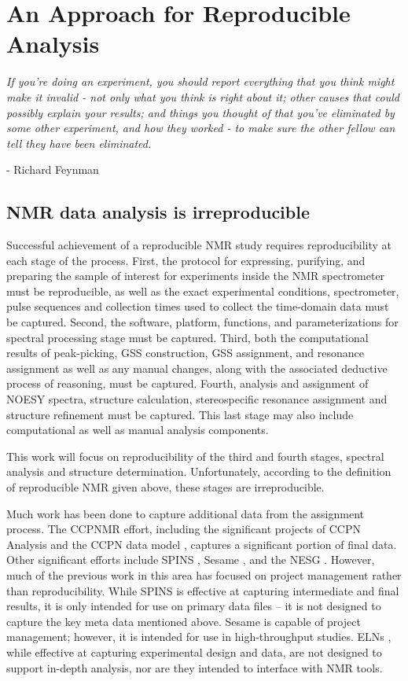 \chapter{An Approach for Reproducible Analysis}

\begin{center}
  \textit{If you're doing an experiment, you should report everything that 
    you think might make it invalid - not only what you think is right about it; 
    other causes that could possibly explain your results; and things you 
    thought of that you've eliminated by some other experiment, and how they 
    worked - to make sure the other fellow can tell they have been eliminated.}

 - Richard Feynman
\end{center}



\section{NMR data analysis is irreproducible}
Successful achievement of a reproducible NMR study requires reproducibility at 
each stage of the process.  First, the protocol for expressing, purifying, and 
preparing the sample of interest for experiments inside the NMR spectrometer 
must be reproducible, as well as the exact experimental conditions, 
spectrometer, pulse sequences and collection times used to collect the 
time-domain data must be captured.  Second, the software, platform, functions, 
and parameterizations for spectral processing stage must be captured.  
Third, both the computational results of peak-picking, GSS construction,
GSS assignment, and resonance assignment as well as any manual changes, 
along with the associated deductive process of reasoning, must be captured.  
Fourth, analysis and assignment of NOESY spectra, structure calculation, 
stereospecific resonance assignment and structure refinement must be captured.  
This last stage may also include computational as well as manual analysis 
components.  

This work will focus on reproducibility of the third and fourth stages, 
spectral analysis and structure determination.  Unfortunately, according to 
the definition of reproducible NMR given above, these stages are irreproducible.

Much work has been done to capture additional data from the assignment process.  
The CCPNMR effort, including the significant projects of CCPN Analysis and the 
CCPN data model \cite{ccpn}, captures a significant portion of final data.
Other significant efforts include SPINS \cite{baran2006spins}, 
Sesame \cite{sesame}, and the NESG \cite{nesg2005nmr}.  
However, much of the previous 
work in this area has focused on project management rather than reproducibility.
While SPINS is effective at capturing intermediate and final results, it is 
only intended for use on primary data files -- it is not designed to capture 
the key meta data mentioned above.  Sesame is capable of project management; 
however, it is intended for use in high-throughput studies.  ELNs 
\cite{rubacha2011eln}, while effective at capturing experimental design and
data, are not designed to support in-depth analysis, nor are they intended
to interface with NMR tools.

